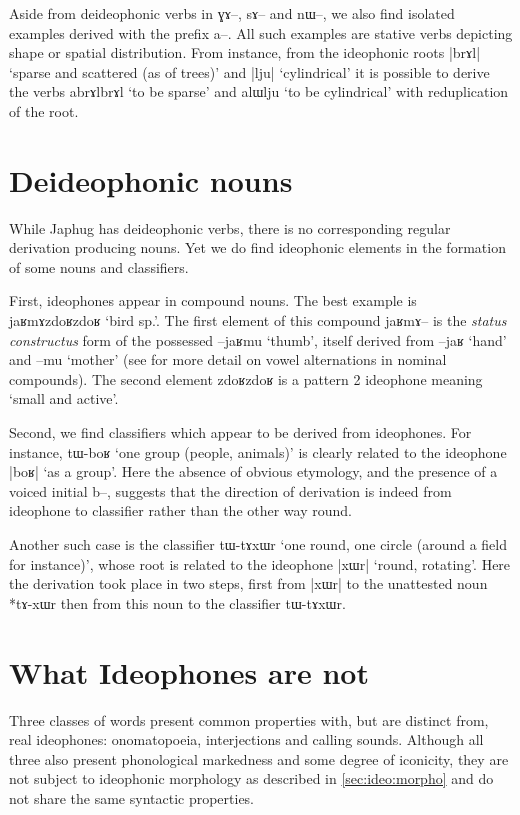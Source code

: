 \documentclass[oldfontcommands,oneside,a4paper,11pt]{article}
\newcommand{\ipa}[1]{{\phon \mbox{#1}}} %
\begin{document}
Aside from deideophonic verbs in \ipa{ɣɤ--}, \ipa{sɤ--} and \ipa{nɯ--}, we also find isolated examples derived with the prefix \ipa{a--}. All such examples are stative verbs depicting shape or spatial distribution. From instance, from the ideophonic roots |\ipa{brɤl}| `sparse and scattered (as of trees)' and |lju| `cylindrical' it is possible to derive the verbs \ipa{abrɤlbrɤl} `to be sparse' and \ipa{alɯlju} `to be cylindrical' with reduplication of the root.
 
 \section{Deideophonic nouns}
While Japhug has  deideophonic verbs, there is no corresponding regular derivation producing nouns. Yet we do find ideophonic elements in the formation of some nouns and classifiers.
 
 
 
 
 First, ideophones appear in compound nouns. The best example is \ipa{jaʁmɤzdoʁzdoʁ} `bird sp.'. The first element of this compound \ipa{jaʁmɤ--} is the \textit{status constructus} form of the possessed \ipa{--jaʁmu} `thumb', itself derived from \ipa{--jaʁ} `hand' and \ipa{--mu} `mother' (see \citealt{jacques12incorp} for more detail on vowel alternations in nominal compounds). The second element \ipa{zdoʁzdoʁ} is a pattern 2 ideophone meaning `small and active'.


Second, we find classifiers which appear to be derived from ideophones. For instance, \ipa{tɯ-boʁ} `one group (people, animals)' is clearly related to the ideophone |\ipa{boʁ}| `as a group'. Here the absence of obvious etymology, and the presence of a voiced initial \ipa{b--}, suggests that the direction of derivation is indeed from ideophone to classifier rather than the other way round.

Another such case is the classifier \ipa{tɯ-tɤxɯr} `one round, one circle (around a field for instance)', whose root is related to the ideophone |\ipa{xɯr}|  `round, rotating'. Here the derivation took place in two steps, first from  |\ipa{xɯr}|   to the unattested noun *\ipa{tɤ-xɯr} then from this noun to the classifier \ipa{tɯ-tɤxɯr}.


\section{What Ideophones are not} \label{sec:non.ideophones}
Three classes of words present common properties with, but are distinct from, real ideophones: onomatopoeia, interjections and calling sounds. Although all three also present phonological markedness and some degree of iconicity, they are not subject to ideophonic morphology as described in \ref{sec:ideo:morpho} and do not share the same syntactic properties.
\end{document}
